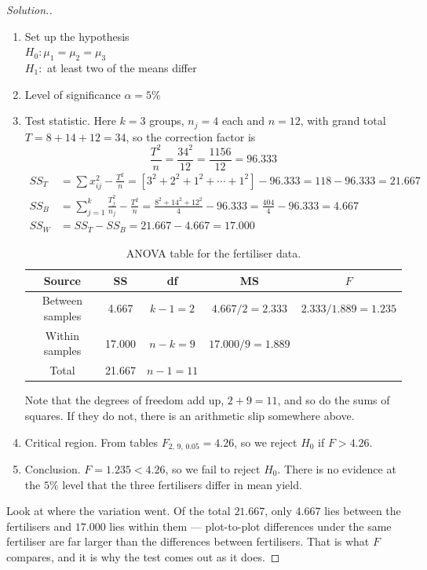 \documentclass[11pt,a4paper]{article}
\theoremstyle{definition}
\newenvironment{solution}
  {\renewcommand{\qedsymbol}{}\begin{proof}[\textit{Solution}.]}
  {\end{proof}}
\begin{document}
\begin{solution}
\begin{enumerate}
\item Set up the hypothesis\\
$H_0: \mu_1=\mu_2=\mu_3$\\
$H_1:$ at least two of the means differ
\item Level of significance $\alpha=5\%$
\item Test statistic. Here $k=3$ groups, $n_j=4$ each and $n=12$, with grand total
$T=8+14+12=34$, so the correction factor is
\[\frac{T^2}{n}=\frac{34^2}{12}=\frac{1156}{12}=96.333\]
\begin{align*}
SS_T &=\sum x_{ij}^2-\frac{T^2}{n}=[3^2+2^2+1^2+\cdots+1^2]-96.333=118-96.333=21.667\\[1ex]
SS_B &=\sum_{j=1}^{k}\frac{T_j^2}{n_j}-\frac{T^2}{n}=\frac{8^2+14^2+12^2}{4}-96.333=\frac{404}{4}-96.333=4.667\\[1ex]
SS_W &=SS_T-SS_B=21.667-4.667=17.000
\end{align*}

\begin{table}[H]
\centering
\begin{tabular}{|c|c|c|c|c|}
\hline
Source & SS & df & MS & $F$\\
\hline
Between samples & 4.667 & $k-1=2$ & $4.667/2=2.333$ & $2.333/1.889=1.235$\\
Within samples & 17.000 & $n-k=9$ & $17.000/9=1.889$ & \\
\hline
Total & 21.667 & $n-1=11$ & & \\
\hline
\end{tabular}
\caption{ANOVA table for the fertiliser data.}
\end{table}

Note that the degrees of freedom add up, $2+9=11$, and so do the sums of squares. If they
do not, there is an arithmetic slip somewhere above.

\item Critical region. From tables $F_{2,\,9,\,0.05}=4.26$, so we reject $H_0$ if
$F>4.26$.
\item Conclusion. $F=1.235<4.26$, so we fail to reject $H_0$. There is no evidence at the
$5\%$ level that the three fertilisers differ in mean yield.
\end{enumerate}

Look at where the variation went. Of the total $21.667$, only $4.667$ lies between the
fertilisers and $17.000$ lies within them --- plot-to-plot differences under the same
fertiliser are far larger than the differences between fertilisers. That is what $F$
compares, and it is why the test comes out as it does.
\end{solution}
\end{document}
